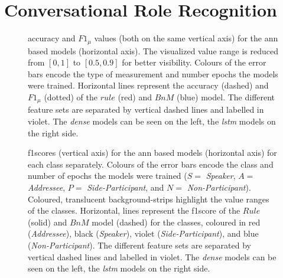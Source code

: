 \chapter{Conversational Role Recognition}

\begin{figure}[!ht]
    \centering
    \begin{footnotesize}
    
    \end{footnotesize}
    \caption[Overall performance of all ANN models.]{\label{app:role-nn-acc} 
    \Gls{accuracy} and \(F1_\mu\) values (both on the same vertical axis) for the \gls{ann} based models (horizontal axis).
    The visualized value range is reduced from \([0,1]\) to \([0.5,0.9]\) for better visibility.
    Colours of the error bars encode the type of measurement and number epochs the models were trained.
    Horizontal lines represent the \gls{accuracy} (dashed) and \(F1_\mu\) (dotted) of the \(rule\) (red) and \(BnM\) (blue) model.
    The different feature sets are separated by vertical dashed lines and labelled in violet.
    The \emph{dense} models can be seen on the left, the \emph{lstm} models on the right side.
    }
\end{figure}

\begin{figure}[!ht]
    \centering
    \begin{footnotesize}
    
    \end{footnotesize}
    \caption[Class-wise performance of all ANN models.]{\label{app:role-nn-f1-class} 
    \Glspl{f1score} (vertical axis) for the \gls{ann} based models (horizontal axis) for each class separately.
    Colours of the error bars encode the class and number of epochs the models were trained (\(S=\) \emph{Speaker}, \(A=\) \emph{Addressee}, \(P=\) \emph{Side-Participant}, and \(N=\) \emph{Non-Participant}).
    Coloured, translucent background-strips highlight the value ranges of the classes.
    Horizontal, lines represent the \gls{f1score} of the \(Rule\) (solid) and \(BnM\) model (dashed) for the classes, coloured in red (\emph{Addressee}), black (\emph{Speaker}), violet (\emph{Side-Participant}), and blue (\emph{Non-Participant}).
    The different feature sets are separated by vertical dashed lines and labelled in violet.
    The \emph{dense} models can be seen on the left, the \emph{lstm} models on the right side.
    }
\end{figure}

